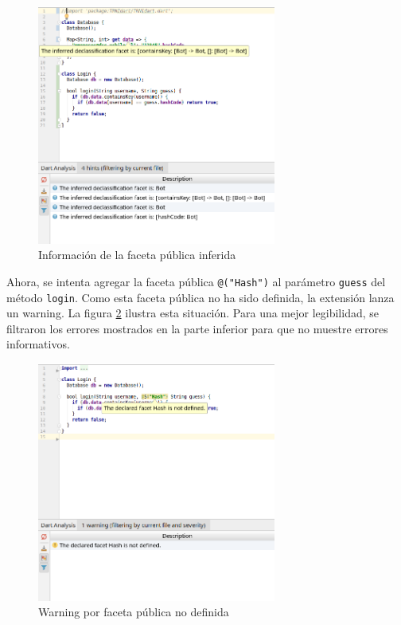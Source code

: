 \begin{figure}[ht]
  \centering
  \includegraphics[width=0.7\textwidth]{imagenes/screen1.png}
  \caption{Información de la faceta pública inferida}
  \label{screen1}
\end{figure}

Ahora, se intenta agregar la faceta pública \texttt{@("Hash")} al parámetro \texttt{guess} del método \texttt{login}. Como esta faceta pública no ha sido definida, la extensión lanza un warning. La figura \ref{screen2} ilustra esta situación. Para una mejor legibilidad, se filtraron los errores mostrados en la parte inferior para que no muestre errores informativos.
\clearpage
\begin{figure}[ht]
  \centering
  \includegraphics[width=0.7\textwidth]{imagenes/screen2.png}
  \caption{Warning por faceta pública no definida}
  \label{screen2}
\end{figure}

